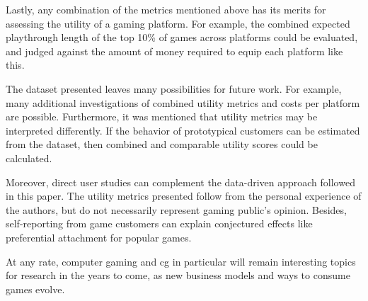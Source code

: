 Lastly, any combination of the metrics mentioned above has its
merits for assessing the utility of a gaming platform. For example,
the combined expected playthrough length of the top 10\% of games
across platforms could be evaluated, and judged against the amount
of money required to equip each platform like this.



The dataset presented leaves many possibilities
for future work. For example, many additional investigations of
combined utility metrics and costs per platform are possible.
Furthermore, it was mentioned that utility metrics may be
interpreted differently. If the behavior of prototypical customers
can be estimated from the dataset, then combined and comparable
utility scores could be calculated.

Moreover, direct user studies can complement the data-driven
approach followed in this paper. The utility metrics presented
follow from the personal experience of the authors, but do not
necessarily represent gaming public's opinion. Besides, self-reporting
from game customers can explain conjectured effects like preferential
attachment for popular games.

At any rate, computer gaming and \gls{cg} in particular will
remain interesting topics for research in the years to come,
as new business models and ways to consume games evolve.

